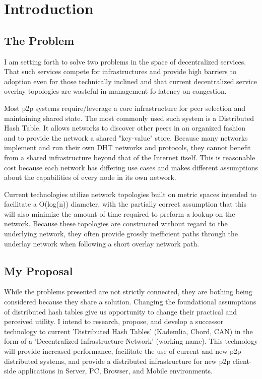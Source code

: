 





\chapter{Introduction}


\section{The Problem}

I am setting forth to solve two problems in the space of decentralized services. That such services compete for infrastructures and provide high barriers to adoption even for those technically inclined and that current decentralized service overlay topologies are wasteful in management fo latency on congestion.

Most p2p systems require/leverage a core infrastructure for peer selection and maintaining shared state.
The most commonly used such system is a Distributed Hash Table\cite{stoica2001chord}.
It allows networks to discover other peers in an organized fashion and to provide the network a shared "key-value" store.
Because many networks implement and run their own DHT networks and protocols, they cannot benefit from a shared infrastructure beyond that of the Internet itself.
This is reasonable cost because each network has differing use cases and makes different assumptions about the capabilities of every node in its own network.

Current technologies utilize network topologies built on metric spaces intended to facilitate a O(log(n)) diameter, with the partially correct assumption that this will also minimize the amount of time required to preform a lookup on the network. 
Because these topologies are constructed without regard to the underlying network, they often provide grossly inefficient paths through the underlay network when following a short overlay network path.


\section{My Proposal}

While the problems presented are not strictly connected, they are bothing being considered because they share a solution.
Changing the foundational assumptions of distributed hash tables give us opportunity to change their practical and perceived utility.
I intend to research, propose, and develop a successor technology to current 'Distributed Hash Tables' (Kademlia, Chord, CAN) in the form of a 'Decentralized Infrastructure Network' (working name).
This technology will provide increased performance, facilitate the use of current and new p2p distributed systems, and provide a distributed infrastructure for new p2p client-side applications in Server, PC, Browser, and Mobile environments.

